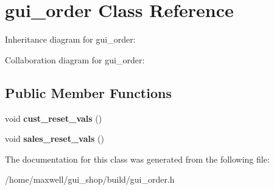 \hypertarget{classgui__order}{}\section{gui\+\_\+order Class Reference}
\label{classgui__order}


Inheritance diagram for gui\+\_\+order\+:


Collaboration diagram for gui\+\_\+order\+:
\subsection*{Public Member Functions}
\begin{DoxyCompactItemize}
\item 
void {\bfseries cust\+\_\+reset\+\_\+vals} ()\hypertarget{classgui__order_a8236b7e04a7778b376eeac676b75e60c}{}\label{classgui__order_a8236b7e04a7778b376eeac676b75e60c}

\item 
void {\bfseries sales\+\_\+reset\+\_\+vals} ()\hypertarget{classgui__order_afb74a05f6de14dc9090d1b12c4d0ea19}{}\label{classgui__order_afb74a05f6de14dc9090d1b12c4d0ea19}

\end{DoxyCompactItemize}


The documentation for this class was generated from the following file\+:\begin{DoxyCompactItemize}
\item 
/home/maxwell/gui\+\_\+shop/build/gui\+\_\+order.\+h\end{DoxyCompactItemize}
